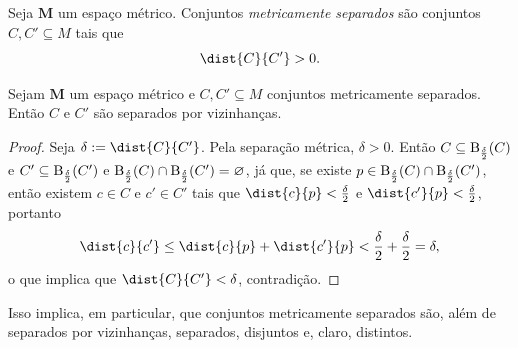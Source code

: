 \begin{defi}
Seja $\bm M$ um espaço métrico. Conjuntos \emph{metricamente separados} são conjuntos $C,C' \subseteq M$ tais que
	\begin{equation*}
	\dist{C}{C'} > 0.
	\end{equation*}
\end{defi}

\begin{prop}
Sejam $\bm M$ um espaço métrico e $C,C' \subseteq M$ conjuntos metricamente separados. Então $C$ e $C'$ são separados por vizinhanças.
\end{prop}
\begin{proof}
Seja $\delta := \dist{C}{C'}$. Pela separação métrica, $\delta > 0$. Então $C \subseteq \mathrm{B}_\frac{\delta}{2}(C)$ e $C' \subseteq \mathrm{B}_\frac{\delta}{2}(C')$ e $\mathrm{B}_\frac{\delta}{2}(C) \cap \mathrm{B}_\frac{\delta}{2}(C') = \varnothing$, já que, se existe $p \in \mathrm{B}_\frac{\delta}{2}(C) \cap \mathrm{B}_\frac{\delta}{2}(C')$, então existem $c \in C$ e $c' \in C'$ tais que $\dist{c}{p} < \frac{\delta}{2}$ e $\dist{c'}{p} < \frac{\delta}{2}$, portanto
	\begin{equation*}
	\dist{c}{c'} \leq \dist{c}{p} + \dist{c'}{p} < \frac{\delta}{2}+\frac{\delta}{2} = \delta,
	\end{equation*}
o que implica que $\dist{C}{C'}<\delta$, contradição.
\end{proof}

Isso implica, em particular, que conjuntos metricamente separados são, além de separados por vizinhanças, separados, disjuntos e, claro, distintos.

